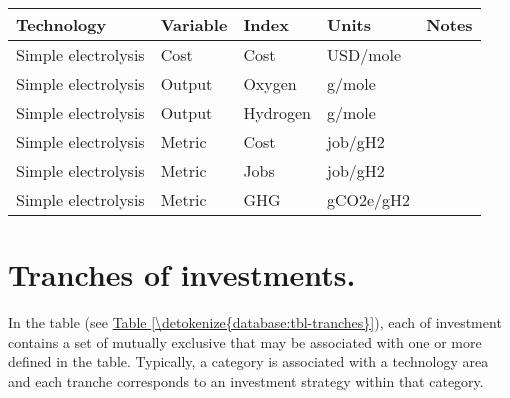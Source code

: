 \documentclass[letterpaper,10pt,english]{sphinxmanual}
\begin{document}
\begin{savenotes}\sphinxattablestart
\centering
{}
\sphinxthecaptionisattop
{}\label{\detokenize{database:table-5}}\label{\detokenize{database:tbl-results}}
\sphinxaftertopcaption
\begin{tabulary}{\linewidth}[t]{|T|T|T|T|T|}
\hline
\sphinxstyletheadfamily 
Technology
&\sphinxstyletheadfamily 
Variable
&\sphinxstyletheadfamily 
Index
&\sphinxstyletheadfamily 
Units
&\sphinxstyletheadfamily 
Notes
\\
\hline
Simple electrolysis
&
Cost
&
Cost
&
USD/mole
&\\
\hline
Simple electrolysis
&
Output
&
Oxygen
&
g/mole
&\\
\hline
Simple electrolysis
&
Output
&
Hydrogen
&
g/mole
&\\
\hline
Simple electrolysis
&
Metric
&
Cost
&
job/gH2
&\\
\hline
Simple electrolysis
&
Metric
&
Jobs
&
job/gH2
&\\
\hline
Simple electrolysis
&
Metric
&
GHG
&
gCO2e/gH2
&\\
\hline
\end{tabulary}
\par
\sphinxattableend\end{savenotes}


\section{Tranches of investments.}
\label{\detokenize{database:tranches-of-investments}}
In the  table (see \hyperref[\detokenize{database:tbl-tranches}]{Table \ref{\detokenize{database:tbl-tranches}}}), each  of
investment contains a set of mutually exclusive  that may be
associated with one or more  defined in the 
table. Typically, a category is associated with a technology area and
each tranche corresponds to an investment strategy within that category.
\end{document}
